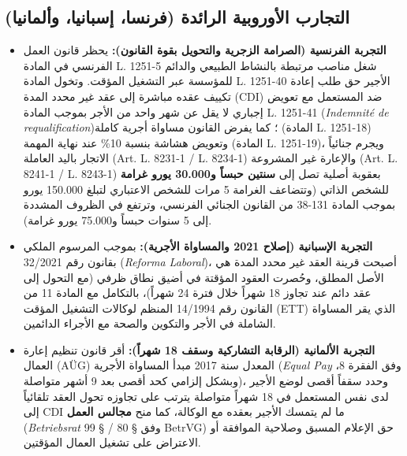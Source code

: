 \subsection{التجارب الأوروبية الرائدة (فرنسا، إسبانيا، وألمانيا)}
\begin{itemize}[leftmargin=*, itemsep=6pt]
    \item \textbf{التجربة الفرنسية (الصرامة الزجرية والتحويل بقوة القانون):} يحظر قانون العمل الفرنسي في المادة \textfrench{L. 1251-5} شغل مناصب مرتبطة بالنشاط الطبيعي والدائم للمؤسسة عبر التشغيل المؤقت. وتخول المادة \textfrench{L. 1251-40} الأجير حق طلب إعادة تكييف عقده مباشرة إلى عقد غير محدد المدة (\textenglish{CDI}) ضد المستعمل مع تعويض إجباري لا يقل عن شهر واحد من الأجر بموجب المادة \textfrench{L. 1251-41} (\textfrench{\textit{Indemnité de requalification}})؛ كما يفرض القانون مساواة أجرية كاملة (المادة \textfrench{L. 1251-18}) وتعويض هشاشة بنسبة \textenglish{10\%} عند نهاية المهمة (المادة \textfrench{L. 1251-19})، ويجرم جنائياً الاتجار باليد العاملة (\textfrench{Art. L. 8231-1 / L. 8234-1}) والإعارة غير المشروعة (\textfrench{Art. L. 8241-1 / L. 8243-1}) بعقوبة أصلية تصل إلى \textbf{سنتين حبساً و\textenglish{30.000} يورو غرامة} للشخص الذاتي (وتتضاعف الغرامة \textenglish{5} مرات للشخص الاعتباري لتبلغ \textenglish{150.000} يورو بموجب المادة \textfrench{131-38} من القانون الجنائي الفرنسي، وترتفع في الظروف المشددة إلى \textenglish{5} سنوات حبساً و\textenglish{75.000} يورو غرامة).
    \item \textbf{التجربة الإسبانية (إصلاح \textenglish{2021} والمساواة الأجرية):} بموجب المرسوم الملكي بقانون رقم \textenglish{32/2021} (\textenglish{\textit{Reforma Laboral}})، أصبحت قرينة العقد غير محدد المدة هي الأصل المطلق، وحُصرت العقود المؤقتة في أضيق نطاق ظرفي (مع التحول إلى عقد دائم عند تجاوز \textenglish{18} شهراً خلال فترة \textenglish{24} شهراً)، بالتكامل مع المادة \textenglish{11} من القانون رقم \textenglish{14/1994} المنظم لوكالات التشغيل المؤقت (\textenglish{ETT}) الذي يقر المساواة الشاملة في الأجر والتكوين والصحة مع الأجراء الدائمين.
    \item \textbf{التجربة الألمانية (الرقابة التشاركية وسقف \textenglish{18} شهراً):} أقر قانون تنظيم إعارة العمال (\textenglish{AÜG}) المعدل سنة \textenglish{2017} مبدأ المساواة الأجرية (\textenglish{\textit{Equal Pay}} وفق الفقرة \textenglish{8}، وبشكل إلزامي كحد أقصى بعد \textenglish{9} أشهر متواصلة)، وحدد سقفاً أقصى لوضع الأجير لدى نفس المستعمل في \textenglish{18} شهراً متواصلة يترتب على تجاوزه تحول العقد تلقائياً إلى \textenglish{CDI} ما لم يتمسك الأجير بعقده مع الوكالة، كما منح \textbf{مجالس العمل} (\textenglish{\textit{Betriebsrat}} وفق \textenglish{§ 80 / § 99 BetrVG}) حق الإعلام المسبق وصلاحية الموافقة أو الاعتراض على تشغيل العمال المؤقتين.
\end{itemize}

